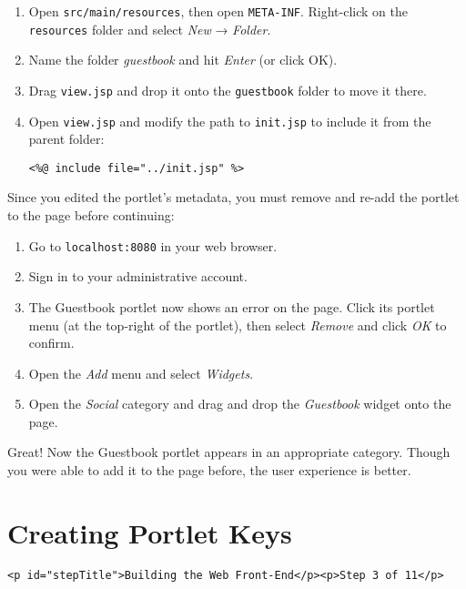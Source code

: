 \begin{enumerate}
\def\labelenumi{\arabic{enumi}.}
\item
  Open \texttt{src/main/resources}, then open \texttt{META-INF}.
  Right-click on the \texttt{resources} folder and select \emph{New} →
  \emph{Folder}.
\item
  Name the folder \emph{guestbook} and hit \emph{Enter} (or click OK).
\item
  Drag \texttt{view.jsp} and drop it onto the \texttt{guestbook} folder
  to move it there.
\item
  Open \texttt{view.jsp} and modify the path to \texttt{init.jsp} to
  include it from the parent folder:

\begin{verbatim}
<%@ include file="../init.jsp" %>
\end{verbatim}
\end{enumerate}

Since you edited the portlet's metadata, you must remove and re-add the
portlet to the page before continuing:

\begin{enumerate}
\def\labelenumi{\arabic{enumi}.}
\item
  Go to \texttt{localhost:8080} in your web browser.
\item
  Sign in to your administrative account.
\item
  The Guestbook portlet now shows an error on the page. Click its
  portlet menu (at the top-right of the portlet), then select
  \emph{Remove} and click \emph{OK} to confirm.
\item
  Open the \emph{Add} menu and select \emph{Widgets}.
\item
  Open the \emph{Social} category and drag and drop the \emph{Guestbook}
  widget onto the page.
\end{enumerate}

Great! Now the Guestbook portlet appears in an appropriate category.
Though you were able to add it to the page before, the user experience
is better.

\chapter{Creating Portlet Keys}\label{creating-portlet-keys}

\begin{verbatim}
<p id="stepTitle">Building the Web Front-End</p><p>Step 3 of 11</p>
\end{verbatim}

